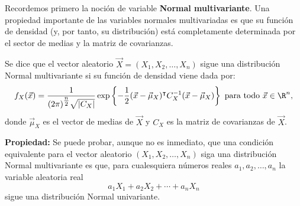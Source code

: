 Recordemos primero la noción de variable \textbf{Normal multivariante}. Una propiedad importante de las variables normales multivariadas es que su función de densidad (y, por tanto, su distribución) está completamente determinada por el sector de medias y la matriz de covarianzas.
\begin{definition}
    Se dice que el vector aleatorio $\vec{X}=(X_1,X_2,\dots,X_n)$ sigue una distribución Normal multivariante si su función de densidad viene dada por: \[
        f_X(\vec{x})=\dfrac{1}{(2\pi)^{\tfrac{n}{2} }\sqrt{|C_X|} }\exp\left\{ -\dfrac{1}{2}(\vec{x}-\vec{\mu}_X)^\intercal C_X^{-1}(\vec{x}-\vec{\mu}_X) \right\} \text{ para todo }\vec{x}\in \R^n,
    \] donde $\vec{\mu}_X$ es el vector de medias de $\vec{X}$ y  $C_X$ es la matriz de covarianzas de  $\vec{X}$.
\end{definition}
\textbf{Propiedad:} Se puede probar, aunque no es inmediato, que una condición equivalente para el vector aleatorio $(X_1,X_2,\dots,X_n)$ siga una distribución Normal multivariante es que, para cualesquiera números reales $a_1,a_2,\dots,a_n$ la variable aleatoria real \[
a_1X_1+a_2X_2+\cdots+a_nX_n
\] sigue una distribución Normal univariante.

